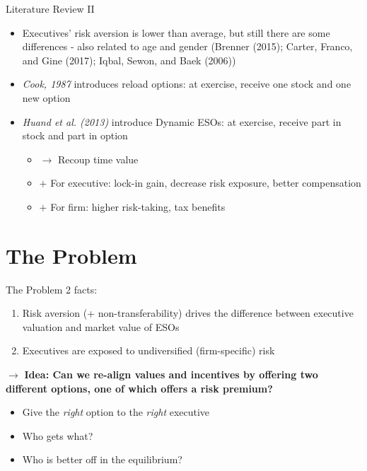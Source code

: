 \documentclass{beamer}
\begin{document}
\begin{frame}{Literature Review II}
    \begin{itemize}
        \item Executives' risk aversion is lower than average, but still there are some differences - also related to age and gender (Brenner (2015); Carter, Franco, and Gine (2017); Iqbal, Sewon, and Baek (2006))
        \item \textit{Cook, 1987} introduces reload options: at exercise, receive one stock and one new option
        \item \textit{Huand et al. (2013)} introduce Dynamic ESOs: at exercise, receive part in stock and part in option 
        \begin{itemize}
            \item $\rightarrow$ Recoup time value
            \item $+$ For executive: lock-in gain, decrease risk exposure, better compensation
            \item $+$ For firm: higher risk-taking, tax benefits
        \end{itemize}
    \end{itemize}
\end{frame}


\section{The Problem}
\begin{frame}{The Problem}
    2 facts:
    \begin{enumerate}
        \item Risk aversion (+ non-transferability) drives the difference between executive valuation and market value of ESOs
        \item Executives are exposed to undiversified (firm-specific) risk
    \end{enumerate}
    \vspace*{10pt}
    $\rightarrow$ \textbf{Idea: Can we re-align values and incentives by offering two different options, one of which offers a risk premium?}
    \begin{itemize}
        \item Give the \textit{right} option to the \textit{right} executive
        \item Who gets what?
        \item Who is better off in the equilibrium?
    \end{itemize}
\end{frame}
\end{document}
